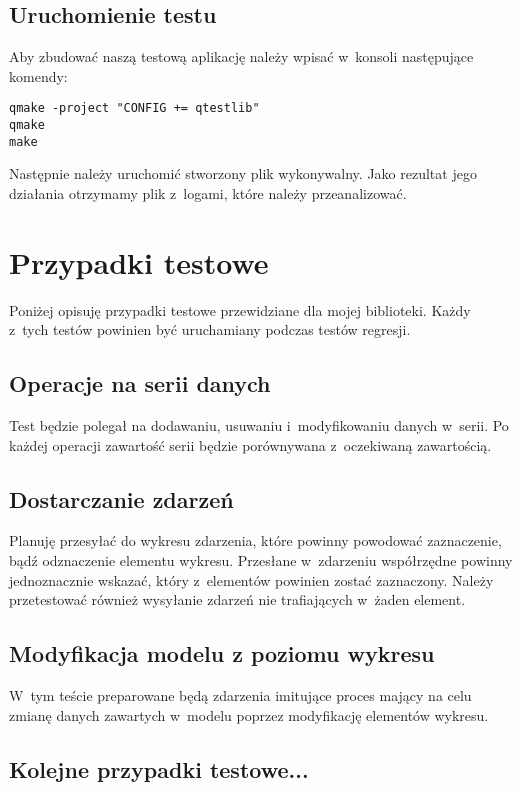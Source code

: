 \subsection{Uruchomienie testu}
Aby zbudować naszą testową aplikację należy wpisać w~konsoli następujące komendy:
\begin{lstlisting}
qmake -project "CONFIG += qtestlib"
qmake
make
\end{lstlisting}

Następnie należy uruchomić stworzony plik wykonywalny. Jako rezultat jego działania otrzymamy plik z~logami, które należy przeanalizować.

\section{Przypadki testowe}
Poniżej opisuję przypadki testowe przewidziane dla mojej biblioteki. Każdy z~tych testów powinien być uruchamiany podczas testów regresji.

\subsection{Operacje na serii danych}
Test będzie polegał na dodawaniu, usuwaniu i~modyfikowaniu danych w~serii. Po każdej operacji zawartość serii będzie porównywana z~oczekiwaną zawartością.

\subsection{Dostarczanie zdarzeń}
Planuję przesyłać do wykresu zdarzenia, które powinny powodować zaznaczenie, bądź odznaczenie elementu wykresu. Przesłane w~zdarzeniu współrzędne powinny jednoznacznie wskazać, który z~elementów powinien zostać zaznaczony. Należy przetestować również wysyłanie zdarzeń nie trafiających w~żaden element. 

\subsection{Modyfikacja modelu z poziomu wykresu}
W~tym teście preparowane będą zdarzenia imitujące proces mający na celu zmianę danych zawartych w~modelu poprzez modyfikację elementów wykresu.

\subsection{Kolejne przypadki testowe...}


